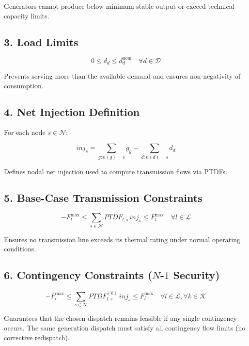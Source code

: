 \documentclass[11pt]{article}
\begin{document}
 
Generators cannot produce below minimum stable output or exceed technical capacity limits.

\subsection*{3. Load Limits}

\begin{equation}
0 \le d_d \le d_d^{\text{nom}}
\quad \forall d \in \mathcal{D}
\end{equation}

 
Prevents serving more than the available demand and ensures non-negativity of consumption.

\subsection*{4. Net Injection Definition}

For each node $s \in \mathcal{N}$:

\begin{equation}
inj_s =
\sum_{g: n(g)=s} g_g
-
\sum_{d: n(d)=s} d_d
\end{equation}

 
Defines nodal net injection used to compute transmission flows via PTDFs.

\subsection*{5. Base-Case Transmission Constraints}

\begin{equation}
- F_l^{\max}
\le
\sum_{s \in \mathcal{N}} PTDF_{l,s} \, inj_s
\le
F_l^{\max}
\quad \forall l \in \mathcal{L}
\end{equation}

 
Ensures no transmission line exceeds its thermal rating under normal operating conditions.

\subsection*{6. Contingency Constraints ($N$-$1$ Security)}

\begin{equation}
- F_l^{\max}
\le
\sum_{s \in \mathcal{N}} PTDF_{l,s}^{(k)} \, inj_s
\le
F_l^{\max}
\quad \forall l \in \mathcal{L}, \forall k \in \mathcal{K}
\end{equation}

 
Guarantees that the chosen dispatch remains feasible if any single contingency occurs.  
The same generation dispatch must satisfy all contingency flow limits (no corrective redispatch).
\end{document}
